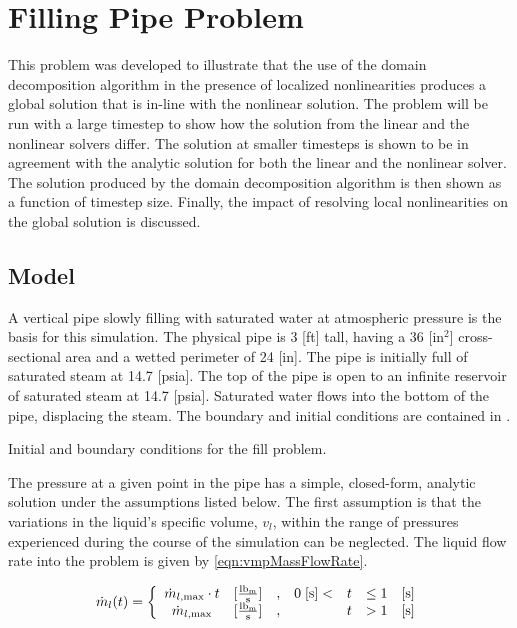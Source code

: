 \section{Filling Pipe Problem}
\label{sect:vmp}
This problem was developed to illustrate that the use of the domain decomposition algorithm in the presence of localized nonlinearities produces a global solution that is in-line with the nonlinear solution.
The problem will be run with a large timestep to show how the solution from the linear and the nonlinear solvers differ.
The solution at smaller timesteps is shown to be in agreement with the analytic solution for both the linear and the nonlinear solver.
The solution produced by the domain decomposition algorithm is then shown as a function of timestep size.
Finally, the impact of resolving local nonlinearities on the global solution is discussed.

\subsection{Model}
\label{subsect:vmpModel}

A vertical pipe slowly filling with saturated water at atmospheric pressure is the basis for this simulation.
The physical pipe is 3 [ft] tall, having a 36 [in$^{2}$] cross-sectional area and a wetted perimeter of 24 [in].
The pipe is initially full of saturated steam at 14.7 [psia].
The top of the pipe is open to an infinite reservoir of saturated steam at 14.7 [psia].
Saturated water flows into the bottom of the pipe, displacing the steam.
The boundary and initial conditions are contained in .

\begin{table}[h!tb]
\centering
\singlespace

\caption{Initial and boundary conditions for the fill problem.}
\label{tab:vmpBCIC}
\end{table}

The pressure at a given point in the pipe has a simple, closed-form, analytic solution under the assumptions listed below.
The first assumption is that the variations in the liquid's specific volume, $v_{l}$, within the range of pressures experienced during the course of the simulation can be neglected.
The liquid flow rate into the problem is given by \eqref{eqn:vmpMassFlowRate}.

\begin{equation}
\label{eqn:vmpMassFlowRate}
\dot{m}_{l}(t) = \left\{
\begin{array}{cclrcll}
 \dot{m}_{l,\text{max}}\cdot t & [\frac{ \lbm{} }{\text{s}}] & , & 0\; [\text{s}] < & t & \leq 1 & [\text{s}] \\
 \dot{m}_{l,\text{max}}        & [\frac{ \lbm{} }{\text{s}}] & , &                  & t & > 1    & [\text{s}]
\end{array}\right.
\end{equation}

